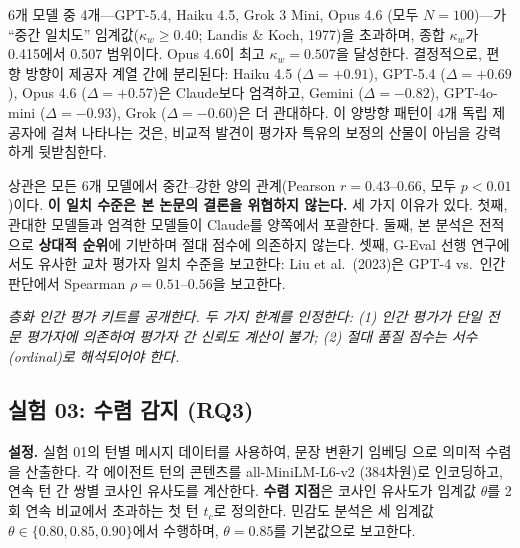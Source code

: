\documentclass[a4paper,11pt]{article}
\begin{document}
6개 모델 중 4개---GPT-5.4, Haiku 4.5, Grok 3 Mini, Opus 4.6 (모두 $N=100$)---가 ``중간 일치도'' 임계값($\kappa_w \geq 0.40$; Landis \& Koch, 1977)을 초과하며, 종합 $\kappa_w$가 0.415에서 0.507 범위이다. Opus 4.6이 최고 $\kappa_w=0.507$을 달성한다. 결정적으로, 편향 방향이 제공자 계열 간에 분리된다: Haiku 4.5 ($\Delta = +0.91$), GPT-5.4 ($\Delta = +0.69$), Opus 4.6 ($\Delta = +0.57$)은 Claude보다 엄격하고, Gemini ($\Delta = -0.82$), GPT-4o-mini ($\Delta = -0.93$), Grok ($\Delta = -0.60$)은 더 관대하다. 이 양방향 패턴이 4개 독립 제공자에 걸쳐 나타나는 것은, 비교적 발견이 평가자 특유의 보정의 산물이 아님을 강력하게 뒷받침한다.

상관은 모든 6개 모델에서 중간--강한 양의 관계(Pearson $r = 0.43$--$0.66$, 모두 $p < 0.01$)이다. \textbf{이 일치 수준은 본 논문의 결론을 위협하지 않는다.} 세 가지 이유가 있다. 첫째, 관대한 모델들과 엄격한 모델들이 Claude를 양쪽에서 포괄한다. 둘째, 본 분석은 전적으로 \textbf{상대적 순위}에 기반하며 절대 점수에 의존하지 않는다. 셋째, G-Eval 선행 연구에서도 유사한 교차 평가자 일치 수준을 보고한다: Liu et al.\ (2023)은 GPT-4 vs.\ 인간 판단에서 Spearman $\rho = 0.51$--$0.56$을 보고한다.

\emph{층화 인간 평가 키트를 공개한다. 두 가지 한계를 인정한다: (1) 인간 평가가 단일 전문 평가자에 의존하여 평가자 간 신뢰도 계산이 불가; (2) 절대 품질 점수는 서수(ordinal)로 해석되어야 한다.}

\subsection{실험 03: 수렴 감지 (RQ3)}
\label{sec:exp03}

\textbf{설정.} 실험 01의 턴별 메시지 데이터를 사용하여, 문장 변환기 임베딩 \citep{reimers2019sentence}으로 의미적 수렴을 산출한다. 각 에이전트 턴의 콘텐츠를 all-MiniLM-L6-v2 (384차원)로 인코딩하고, 연속 턴 간 쌍별 코사인 유사도를 계산한다. \textbf{수렴 지점}은 코사인 유사도가 임계값 $\theta$를 2회 연속 비교에서 초과하는 첫 턴 $t_c$로 정의한다. 민감도 분석은 세 임계값 $\theta \in \{0.80, 0.85, 0.90\}$에서 수행하며, $\theta=0.85$를 기본값으로 보고한다.
\end{document}
